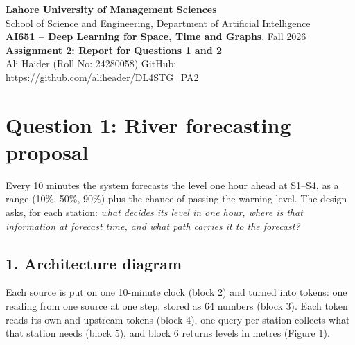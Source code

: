 \documentclass[10pt,a4paper]{article}
\begin{document}
\begin{center}
{\bfseries Lahore University of Management Sciences}\\
School of Science and Engineering, Department of Artificial Intelligence\\
{\bfseries AI651 -- Deep Learning for Space, Time and Graphs}, Fall 2026\\[3pt]
{\bfseries Assignment 2: Report for Questions 1 and 2}\\
Ali Haider (Roll No: 24280058) \quad GitHub: \url{https://github.com/aliheader/DL4STG_PA2}
\end{center}

\section{Question 1: River forecasting proposal}

Every 10 minutes the system forecasts the level one hour ahead at S1--S4, as a range (10\%, 50\%, 90\%) plus the chance of passing the warning level. The design asks, for each station: \emph{what decides its level in one hour, where is that information at forecast time, and what path carries it to the forecast?}

\subsection{1. Architecture diagram}
Each source is put on one 10-minute clock (block 2) and turned into tokens: one reading from one source at one step, stored as 64 numbers (block 3). Each token reads its own and upstream tokens (block 4), one query per station collects what that station needs (block 5), and block 6 returns levels in metres (Figure 1).
\end{document}
